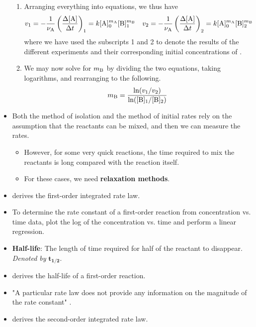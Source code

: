 \documentclass[../notes.tex]{subfiles}
\begin{document}
\begin{itemize}
\begin{enumerate}
        \item Arranging everything into equations, we thus have
        \begin{align*}
            v_1 &= -\frac{1}{\nu_{\ce{A}}}\left( \frac{\Delta[\ce{A}]}{\Delta t} \right)_1
            = k[\ce{A}]_0^{m_{\ce{A}}}[\ce{B}]_1^{m_{\ce{B}}}&
            v_2 &= -\frac{1}{\nu_{\ce{A}}}\left( \frac{\Delta[\ce{A}]}{\Delta t} \right)_2
            = k[\ce{A}]_0^{m_{\ce{A}}}[\ce{B}]_2^{m_{\ce{B}}}
        \end{align*}
        where we have used the subscripts 1 and 2 to denote the results of the different experiments and their corresponding initial concentrations of .
        \item We may now solve for $m_{\ce{B}}$ by dividing the two equations, taking logarithms, and rearranging to the following.
        \begin{equation*}
            m_{\ce{B}} = \frac{\ln(v_1/v_2)}{\ln([\ce{B}]_1/[\ce{B}]_2)}
        \end{equation*}
    \end{enumerate}
    \item Both the method of isolation and the method of initial rates rely on the assumption that the reactants can be mixed, and then we can measure the rates.
    \begin{itemize}
        \item However, for some very quick reactions, the time required to mix the reactants is long compared with the reaction itself.
        \item For these cases, we need \textbf{relaxation methods}.
    \end{itemize}
    \item {}\textcite{bib:McQuarrieSimon} derives the first-order integrated rate law.
    \item To determine the rate constant of a first-order reaction from concentration vs. time data, plot the log of the concentration vs. time and perform a linear regression.
    \item \textbf{Half-life}: The length of time required for half of the reactant to disappear. \emph{Denoted by} $\bm{t_{1/2}}$.
    \item \textcite{bib:McQuarrieSimon} derives the half-life of a first-order reaction.
    \item "A particular rate law does not provide any information on the magnitude of the rate constant" \parencite[1057]{bib:McQuarrieSimon}.
    \item \textcite{bib:McQuarrieSimon} derives the second-order integrated rate law.

\end{itemize}
\end{document}
